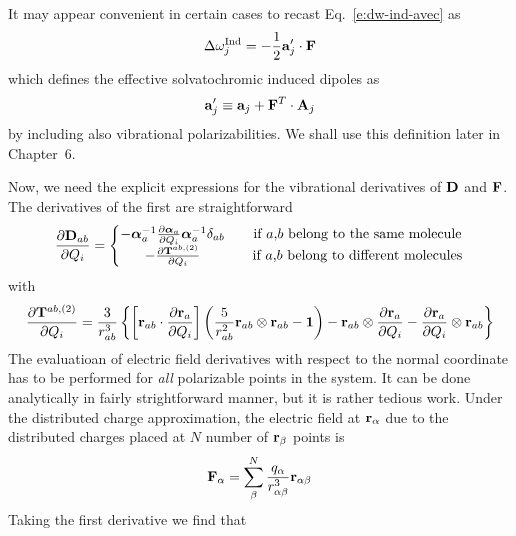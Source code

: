 \documentclass[a4paper,titlepage,twoside,fleqn,12pt]{book}
\newcommand{\BM}[1]{\bm{#1}}
\newcommand{\fderiv}[2]{\ensuremath{
\frac{\partial #1}{\partial #2}}}
\begin{document}
\begin{refsection}
It may appear convenient in certain cases
to recast Eq.~\eqref{e:dw-ind-avec} as
%
\begin{equation}\label{e:dw-ind-avec-alternative}
\Delta\omega_j^{\rm Ind} = - \frac{1}{2}   {\bf a}_j' \cdot {\bf F} 
\end{equation}
%
which defines the effective solvatochromic induced dipoles as 
%
\begin{equation}\label{e:avec-prime}
{\bf a}_j' \equiv {\bf a}_j + {\bf F}^T \cdot {\bf A}_j
\end{equation}
% 
by including also vibrational polarizabilities. We shall use this definition
later in Chapter~6.

Now, we need the explicit expressions for the vibrational
derivatives of $\bf D$ and $\bf F$. The derivatives of the first are straightforward
%
\begin{equation}
\fderiv{{\bf D}_{ab}}{Q_i} = 
\left\{\begin{matrix}               
-{\BM \alpha}_a^{-1} \fderiv{{\BM \alpha}_a}{Q_i} {\BM \alpha}_a^{-1} 
                       \delta_{ab} && \text{if $a$,$b$ belong to the same molecule} \\
-\fderiv{{\bf T}^{ab,(2)}}{Q_i}  && \text{if $a$,$b$ belong to different molecules}
\end{matrix}\right. 
\end{equation}
%
with
%
\begin{equation}
\fderiv{{\bf T}^{ab,(2)}}{Q_i} = \frac{3}{r_{ab}^3} 
       \left\{ 
           \left[ 
                {\bf r}_{ab} \cdot \fderiv{{\bf r}_{a}}{Q_i} 
           \right]
           \left(
                 \frac{5}{r_{ab}^2} {\bf r}_{ab} \otimes {\bf r}_{ab} - {\bf 1}
           \right) -
                 {\bf r}_{ab} \otimes \fderiv{{\bf r}_{a}}{Q_i} - \fderiv{{\bf r}_{a}}{Q_i} \otimes {\bf r}_{ab}
       \right\}
\end{equation}
%
The evaluatioan of electric field derivatives with respect to the normal coordinate 
has to be performed for \emph{all} polarizable points in the system. 
It can be done analytically
in fairly strightforward manner, but it is rather tedious work. 
Under the distributed charge approximation, 
the electric field at ${\bf r}_\alpha$ due to the 
distributed charges placed at $N$ number of ${\bf r}_\beta$ points is
%
\begin{equation}
{\bf F}_\alpha = \sum_\beta^N \frac{q_\alpha}{r_{\alpha\beta}^3} {\bf r}_{\alpha\beta}
\end{equation}
%
Taking the first derivative we find that

\end{refsection}
\end{document}
